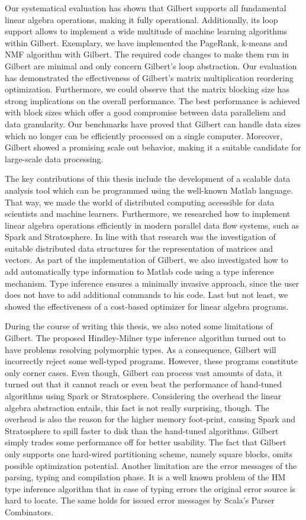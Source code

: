 Our systematical evaluation has shown that Gilbert supports all fundamental linear algebra operations, making it fully operational.
Additionally, its loop support allows to implement a wide multitude of machine learning algorithms within Gilbert.
Exemplary, we have implemented the PageRank, k-means and NMF algorithm with Gilbert.
The required code changes to make them run in Gilbert are minimal and only concern Gilbert's loop abstraction.
Our evaluation has demonstrated the effectiveness of Gilbert's matrix multiplication reordering optimization.
Furthermore, we could observe that the matrix blocking size has strong implications on the overall performance.
The best performance is achieved with block sizes which offer a good compromise between data parallelism and data granularity.
Our benchmarks have proved that Gilbert can handle data sizes which no longer can be efficiently processed on a single computer.
Moreover, Gilbert showed a promising scale out behavior, making it a suitable candidate for large-scale data processing.

The key contributions of this thesis include the development of a scalable data analysis tool which can be programmed using the well-known Matlab language.
That way, we made the world of distributed computing accessible for data scientists and machine learners.
Furthermore, we researched how to implement linear algebra operations efficiently in modern parallel data flow systems, such as Spark and Stratosphere.
In line with that research was the investigation of suitable distributed data structures for the representation of matrices and vectors.
As part of the implementation of Gilbert, we also investigated how to add automatically type information to Matlab code using a type inference mechanism.
Type inference ensures a minimally invasive approach, since the user does not have to add additional commands to his code.
Last but not least, we showed the effectiveness of a cost-based optimizer for linear algebra programs.

During the course of writing this thesis, we also noted some limitations of Gilbert.
The proposed Hindley-Milner type inference algorithm turned out to have problems resolving polymorphic types.
As a consequence, Gilbert will incorrectly reject some well-typed programs.
However, these programs constitute only corner cases.
Even though, Gilbert can process vast amounts of data, it turned out that it cannot reach or even beat the performance of hand-tuned algorithms using Spark or Stratosphere.
Considering the overhead the linear algebra abstraction entails, this fact is not really surprising, though.
The overhead is also the reason for the higher memory foot-print, causing Spark and Stratosphere to spill faster to disk than the hand-tuned algorithms.
Gilbert simply trades some performance off for better usability.
The fact that Gilbert only supports one hard-wired partitioning scheme, namely square blocks, omits possible optimization potential.
Another limitation are the error messages of the parsing, typing and compilation phase.
It is a well known problem of the HM type inference algorithm that in case of typing errors the original error source is hard to locate.
The same holds for issued error messages by Scala's Parser Combinators.


